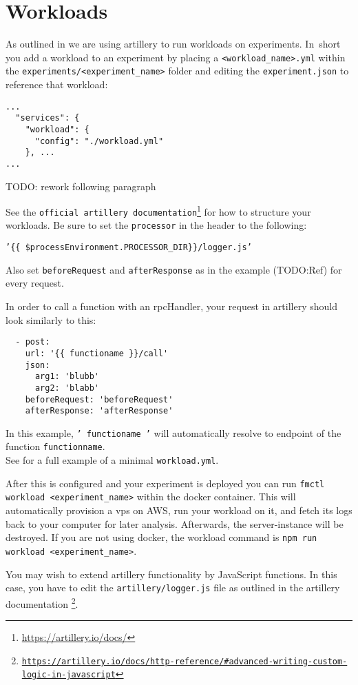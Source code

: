 \documentclass[../main.tex]{subfiles}
\begin{document}
\section{Workloads}\label{sec:WorkloadsUsage}

As outlined in  we are using artillery to run workloads on experiments. 
In~short you add a workload to an experiment by placing a \texttt{<workload\_name>.yml} 
within the \texttt{experiments/<experiment\_name>} 
folder and editing the \texttt{experiment.json} to reference that workload:

\begin{tcolorbox}[titleDetachedStyle, title=\texttt{experiment.json}]
\begin{verbatim}
...
  "services": {
    "workload": {
      "config": "./workload.yml"
    }, ...
...
\end{verbatim}
\end{tcolorbox}

TODO: rework following paragraph

See the \texttt{official artillery documentation}\footnote{\url{https://artillery.io/docs/}} for how to structure your workloads. 
Be sure to set the \texttt{processor} in the header to the following:\\
\begin{tcolorbox}
  \texttt{'\{\{ \$processEnvironment.PROCESSOR\_DIR\}\}/logger.js'} 
\end{tcolorbox}
Also set \texttt{beforeRequest} and \texttt{afterResponse} as in the example (TODO:\@ Ref) for every request. 

In order to call a function with an rpcHandler, your request in artillery should look similarly to this:
\begin{tcolorbox}[titleDetachedStyle, title=\texttt{workload.yml}]
\begin{verbatim}
  - post:
    url: '{{ functioname }}/call'
    json:
      arg1: 'blubb' 
      arg2: 'blabb'
    beforeRequest: 'beforeRequest'
    afterResponse: 'afterResponse'
\end{verbatim}
\end{tcolorbox}
In this example, \texttt{'{{ functioname }}'} will automatically resolve to endpoint of the function \texttt{functionname}. \\
See  for a full example of a minimal \texttt{workload.yml}.

After this is configured and your experiment is deployed you can run \texttt{fmctl workload <experiment\_name>} 
within the docker container. This will automatically provision a vps on AWS, run your workload on it, and
fetch its logs back to your computer for later analysis. Afterwards, the server-instance will be destroyed.
If you are not using docker, the workload command is \texttt{npm run workload <experiment\_name>}.

You may wish to extend artillery functionality by JavaScript functions.
In this case, you have to edit the \texttt{artillery/logger.js} file as outlined in the artillery documentation%
\footnote{\href{https://artillery.io/docs/http-reference}%
{\texttt{https://artillery.io/docs/http-reference/\#advanced-writing-custom-logic-in-javascript}}}.
\end{document}

